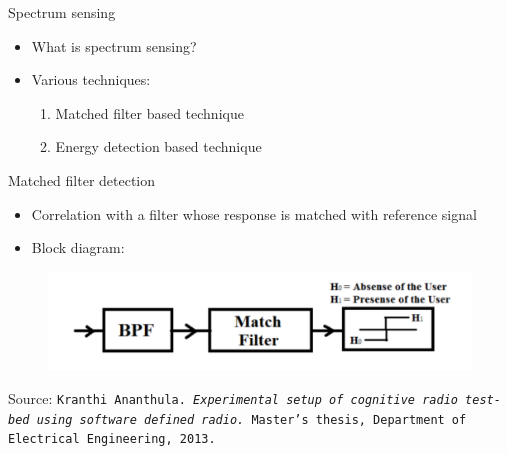 \documentclass{beamer}
\begin{document}
  \begin{frame}{Spectrum sensing}
    \begin{itemize}
      \item What is spectrum sensing?
      \item Various techniques:
      \begin{enumerate}
        \item Matched filter based technique
        \item Energy detection based technique
      \end{enumerate}
    \end{itemize}
  \end{frame}

  \begin{frame}{Matched filter detection}
    \begin{minipage}[t][0.8\textheight][t]{\textwidth}
      \begin{itemize}
	\item Correlation with a filter whose response is matched with reference signal
	\item Block diagram:
      \end{itemize}
      \begin{figure}
	\centering
	\includegraphics[width=0.97\linewidth]{img/matchedFilter}
      \end{figure}
      \vfill
      \tiny{Source: \texttt{Kranthi Ananthula. \emph{Experimental setup of cognitive radio test-bed using software
defined radio.} Master's thesis, Department of Electrical Engineering, 2013.}}
   \end{minipage}
  \end{frame}
\end{document}
